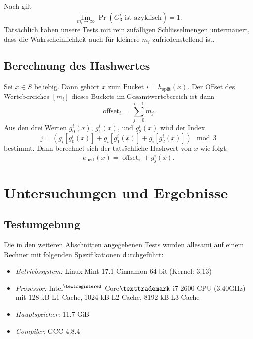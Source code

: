 \documentclass[a4paper,12pt,twoside]{report}
\begin{document}
Nach \cite[Theorem 3.5]{Botelho2013108} gilt
\[\lim_{m_i\to\infty}{\Pr(G_3^i\text{ ist azyklisch})}=1.\]
Tatsächlich haben unsere Tests mit rein zufälligen Schlüsselmengen untermauert, dass die Wahrscheinlichkeit auch für kleinere $m_i$ zufriedenstellend ist.

\section{Berechnung des Hashwertes}
\label{sec:berechnungHashwert}

Sei $x\in S$ beliebig.
Dann gehört $x$ zum Bucket $i=h_{\text{split}}(x)$.
Der Offset des Wertebereiches $[m_i]$ dieses Buckets im Gesamtwertebereich ist dann
\[\operatorname{offset}_i=\sum_{j=0}^{i-1}{m_j}.\]
Aus den drei Werten $g_0^i(x)$, $g_1^i(x)$, und $g_2^i(x)$ wird der Index
\[j=(g_i[g_0^i(x)]+g_i[g_1^i(x)]+g_i[g_2^i(x)])\mod 3\]
bestimmt. Dann berechnet sich der tatsächliche Hashwert von $x$ wie folgt:
\[h_{\text{perf}}(x)=\operatorname{offset}_i+g_j^i(x).\]


\chapter{Untersuchungen und Ergebnisse}
\label{cha:untersuchungenErgebnisse}

\section{Testumgebung}
\label{sec:testumgebung}

Die in den weiteren Abschnitten angegebenen Tests wurden allesamt auf einem Rechner mit folgenden Spezifikationen durchgeführt:
\begin{itemize}
 \item \emph{Betriebssystem:} Linux Mint 17.1 Cinnamon 64-bit (Kernel: 3.13)
 \item \emph{Prozessor:} Intel$^{\textregistered}$ Core$\texttrademark$ i7-2600 CPU (3.40GHz) mit 128 kB L1-Cache, 1024 kB L2-Cache, 8192 kB L3-Cache
 \item \emph{Hauptspeicher:} 11.7 GiB
 \item \emph{Compiler:} GCC 4.8.4
\end{itemize}
\end{document}
